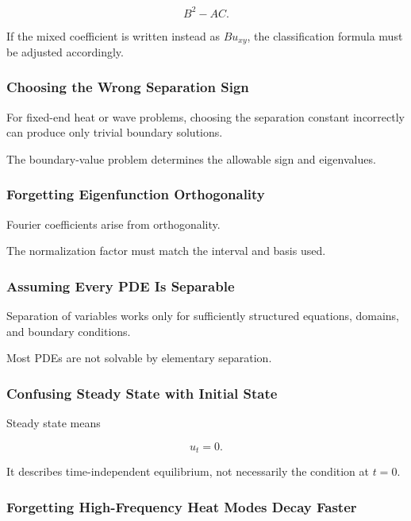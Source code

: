 \[
\boxed{
B^2-AC.
}
\]

If the mixed coefficient is written instead as \(Bu_{xy}\), the
classification formula must be adjusted accordingly.

\subsubsection{Choosing the Wrong Separation Sign}

For fixed-end heat or wave problems, choosing the separation constant
incorrectly can produce only trivial boundary solutions.

The boundary-value problem determines the allowable sign and eigenvalues.

\subsubsection{Forgetting Eigenfunction Orthogonality}

Fourier coefficients arise from orthogonality.

The normalization factor must match the interval and basis used.

\subsubsection{Assuming Every PDE Is Separable}

Separation of variables works only for sufficiently structured equations,
domains, and boundary conditions.

Most PDEs are not solvable by elementary separation.

\subsubsection{Confusing Steady State with Initial State}

Steady state means

\[
\boxed{
u_t=0.
}
\]

It describes time-independent equilibrium, not necessarily the condition
at \(t=0\).

\subsubsection{Forgetting High-Frequency Heat Modes Decay Faster}

